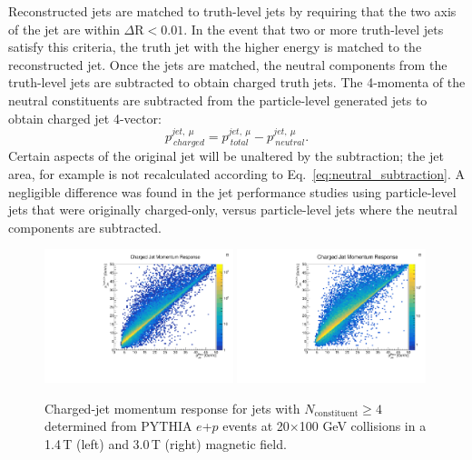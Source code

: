 Reconstructed jets are matched to truth-level jets by requiring that the two axis of the jet are within $\Delta\mathrm{R} < 0.01$. In the event that two or more truth-level jets satisfy this criteria, the truth jet with the higher energy is matched to the reconstructed jet.
%
Once the jets are matched, the neutral components from the truth-level jets are subtracted to obtain charged truth jets. 
The 4-momenta of the neutral constituents are subtracted from the particle-level generated jets to obtain charged jet 4-vector:
\begin{equation}
\label{eq:neutral_subtraction}
p^{{jet, \ }\mu}_{\mathrm \ charged} = p^{{jet, \ }\mu}_{\mathrm \ total}  - p^{{jet, \ }\mu}_{\mathrm \ neutral}.
\end{equation}
%
Certain aspects of the original jet will be unaltered by the subtraction; the jet area, for example is not recalculated according to Eq.~\ref{eq:neutral_subtraction}. 
A negligible difference was found in the jet performance studies using particle-level jets that were originally charged-only, versus particle-level jets where the neutral components are subtracted.

\begin{figure}[htbp]
    \centering
    \includegraphics[width=0.49\textwidth]{EIC_Jets/1.4T_momentum_response.pdf}
    \includegraphics[width=0.49\textwidth]{EIC_Jets/3T_momentum_response.pdf}
    \caption{Charged-jet momentum response for jets with $N_\mathrm{constituent} \geq 4$ determined from PYTHIA $e$+$p$ events at 20$\times$100 GeV collisions in a 1.4\,T (left) and 3.0\,T (right) magnetic field.}
    \label{fig:jet_response}
\end{figure}

